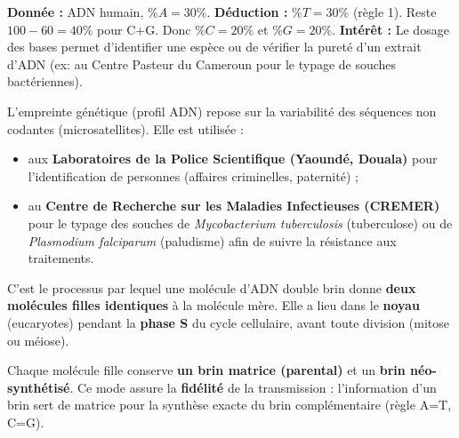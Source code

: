 \documentclass[11pt]{article}
\newcounter{popsec}
\newcounter{popsub}
\newcommand{\courssub}[1]{%
  \stepcounter{popsub}%
  \par\vspace{9pt}\noindent{\popxbold\fontsize{11.5}{13}\selectfont\color{popink}{\color{poporange}\thepopsec.\thepopsub}\hspace{6pt}#1}\par\nopagebreak\vspace{4pt}
}
\begin{document}
\begin{exemplebox}
\textbf{Donnée :} ADN humain, $\%A = 30\%$.
\textbf{Déduction :} $\%T = 30\%$ (règle 1). Reste $100 - 60 = 40\%$ pour C+G. Donc $\%C = 20\%$ et $\%G = 20\%$.
\textbf{Intérêt :} Le dosage des bases permet d'identifier une espèce ou de vérifier la pureté d'un extrait d'ADN (ex: au Centre Pasteur du Cameroun pour le typage de souches bactériennes).
\end{exemplebox}

\begin{savaistu}
L'empreinte génétique (profil ADN) repose sur la variabilité des séquences non codantes (microsatellites). Elle est utilisée :
\begin{itemize}
    \item aux \textbf{Laboratoires de la Police Scientifique (Yaoundé, Douala)} pour l'identification de personnes (affaires criminelles, paternité) ;
    \item au \textbf{Centre de Recherche sur les Maladies Infectieuses (CREMER)} pour le typage des souches de \emph{Mycobacterium tuberculosis} (tuberculose) ou de \emph{Plasmodium falciparum} (paludisme) afin de suivre la résistance aux traitements.
\end{itemize}
\end{savaistu}

\courssub{La duplication de l'ADN}

\begin{definition}
C'est le processus par lequel une molécule d'ADN double brin donne \textbf{deux molécules filles identiques} à la molécule mère. Elle a lieu dans le \textbf{noyau} (eucaryotes) pendant la \textbf{phase S} du cycle cellulaire, avant toute division (mitose ou méiose).
\end{definition}

\begin{propriete}
Chaque molécule fille conserve \textbf{un brin matrice (parental)} et un \textbf{brin néo-synthétisé}. Ce mode assure la \textbf{fidélité} de la transmission : l'information d'un brin sert de matrice pour la synthèse exacte du brin complémentaire (règle A=T, C=G).
\end{propriete}
\end{document}
